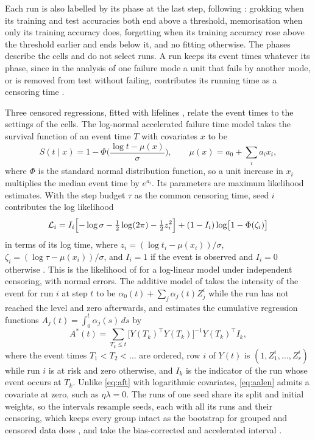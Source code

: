 \documentclass[a4paper,11pt]{article} %
\begin{document}
Each run is also labelled by its phase at the last step, following
\citet{pracherSpectralTheoryGrokking2026}: grokking when its training and test
accuracies both end above a threshold, memorisation when only its training
accuracy does, forgetting when its training accuracy rose above the threshold
earlier and ends below it, and no fitting otherwise. The phases describe the
cells and do not select runs. A run keeps its event times whatever its phase,
since in the analysis of one failure mode a unit that fails by another mode, or
is removed from test without failing, contributes its running time as a
censoring time \citep{nelsonAcceleratedTestingStatistical1990}.

Three censored regressions, fitted with lifelines
\citep{davidson-pilonLifelinesSurvivalAnalysis2019}, relate the event times to
the settings of the cells. The log-normal accelerated failure time model takes
the survival function of an event time $T$ with covariates $x$ to be
\begin{equation}
  S(t\mid x) = 1-\Phi\biggl(\frac{\log t-\mu(x)}{\sigma}\biggr),\qquad
  \mu(x) = a_0 + \sum_{i}a_i x_i ,
  \label{eq:aft}
\end{equation}
where $\Phi$ is the standard normal distribution function, so a unit increase
in $x_i$ multiplies the median event time by $e^{a_i}$. Its parameters are
maximum likelihood estimates. With the step budget $\tau$ as the common
censoring time, seed $i$ contributes the log likelihood
\begin{equation}
  \mathcal{L}_i = I_i\Bigl[-\log\sigma-\tfrac{1}{2}\log(2\pi)
  -\tfrac{1}{2}z_i^2\Bigr] + (1-I_i)\log\bigl[1-\Phi(\zeta_i)\bigr]
\end{equation}
in terms of its log time, where $z_i=(\log t_i-\mu(x_i))/\sigma$,
$\zeta_i=(\log\tau-\mu(x_i))/\sigma$, and $I_i=1$ if the event is observed and
$I_i=0$ otherwise \citep{nelsonAcceleratedTestingStatistical1990}. This is the
likelihood of \citet{kalbfleischStatisticalAnalysisFailure2002} for a
log-linear model under independent censoring, with normal errors. The additive
model of
\citet{aalenLinearRegressionModel1989} takes the intensity of the event for
run $i$ at step $t$ to be $\alpha_0(t)+\sum_j\alpha_j(t)Z_j^i$ while the run
has not reached the level and zero afterwards, and estimates the cumulative
regression functions $A_j(t)=\int_0^t\alpha_j(s)\,ds$ by
\begin{equation}
  A^*(t) = \sum_{T_k\le t} \bigl[Y(T_k)^\top Y(T_k)\bigr]^{-1}Y(T_k)^\top I_k ,
  \label{eq:aalen}
\end{equation}
where the event times $T_1<T_2<\dots$ are ordered, row $i$ of $Y(t)$ is
$(1,Z_1^i,\dots,Z_r^i)$ while run $i$ is at risk and zero otherwise, and
$I_k$ is the indicator of the run whose event occurs at $T_k$. Unlike
\eqref{eq:aft} with logarithmic covariates, \eqref{eq:aalen} admits a covariate
at zero, such as $\eta\lambda=0$. The runs of one seed share its split and
initial weights, so the intervals resample seeds, each with all its runs and
their censoring, which keeps every group intact as the bootstrap for grouped
and censored data does \citep{davisonBootstrapMethodsTheir1997}, and take the
bias-corrected and accelerated interval
\citep{efronIntroductionBootstrap1994}.
\end{document}
